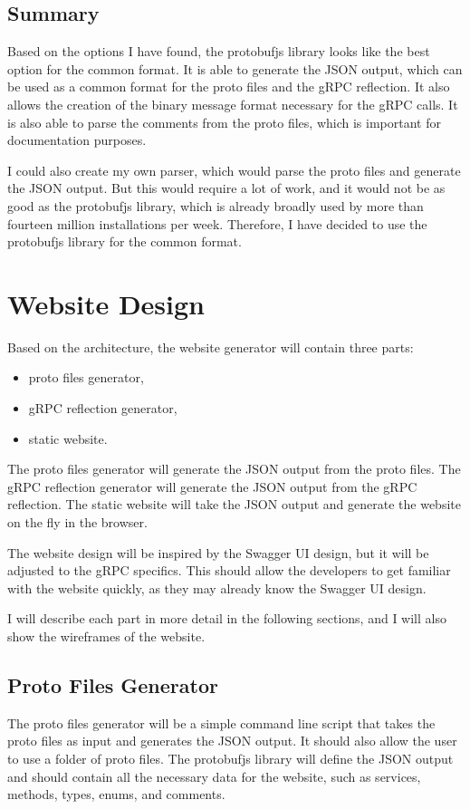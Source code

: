 \subsection{Summary}

Based on the options I have found, the protobufjs library looks like the best option for the common format.
It is able to generate the JSON output, which can be used as a common format for the proto files and the gRPC reflection.
It also allows the creation of the binary message format necessary for the gRPC calls.
It is also able to parse the comments from the proto files, which is important for documentation purposes.

I could also create my own parser, which would parse the proto files and generate the JSON output.
But this would require a lot of work, and it would not be as good as the protobufjs library, which is already broadly used by more than fourteen million installations per week.
Therefore, I have decided to use the protobufjs library for the common format.


\section{Website Design}
Based on the architecture, the website generator will contain three parts:
\begin{itemize}
    \item proto files generator,
    \item gRPC reflection generator,
    \item static website.
\end{itemize}

The proto files generator will generate the JSON output from the proto files.
The gRPC reflection generator will generate the JSON output from the gRPC reflection.
The static website will take the JSON output and generate the website on the fly in the browser.

The website design will be inspired by the Swagger UI design, but it will be adjusted to the gRPC specifics.
This should allow the developers to get familiar with the website quickly, as they may already know the Swagger UI design.

I will describe each part in more detail in the following sections, and I will also show the wireframes of the website.

\subsection{Proto Files Generator}
The proto files generator will be a simple command line script that takes the proto files as input and generates the JSON output.
It should also allow the user to use a folder of proto files.
The protobufjs library will define the JSON output and should contain all the necessary data for the website, such as services, methods, types, enums, and comments.

